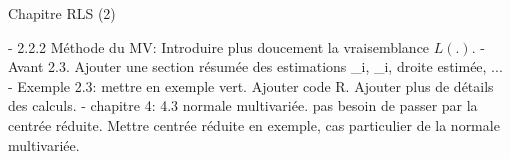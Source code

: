 Chapitre RLS (2)

- 2.2.2 Méthode du MV: Introduire plus doucement la vraisemblance $L(.)$.
- Avant 2.3. Ajouter une section résumée des estimations _i, \hat{\varepsilon}_i, droite estimée, ...
- Exemple 2.3: mettre en exemple vert. Ajouter code R. Ajouter plus de détails des calculs.
- chapitre 4: 4.3 normale multivariée. pas besoin de passer par la centrée réduite. Mettre centrée réduite en exemple, cas particulier de la normale multivariée.